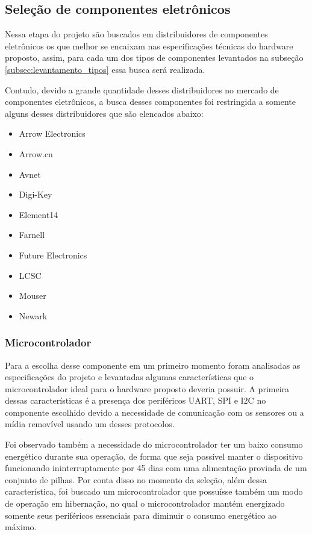\subsection{Seleção de componentes eletrônicos}

Nessa etapa do projeto são buscados em distribuidores de componentes eletrônicos os que melhor se encaixam nas especificações técnicas do hardware proposto, assim, para cada um dos tipos de componentes levantados na subseção \ref{subsec:levantamento_tipos} essa busca será realizada. 

Contudo, devido a grande quantidade desses distribuidores no mercado de componentes eletrônicos, a busca desses componentes foi restringida a somente alguns desses distribuidores que são elencados abaixo:

\begin{itemize}
    \item Arrow Electronics 	
    \item Arrow.cn 	
    \item Avnet 	
    \item Digi-Key 	
    \item Element14 	
    \item Farnell 	
    \item Future Electronics 	
    \item LCSC 	
    \item Mouser 	
    \item Newark
\end{itemize}

\subsubsection{Microcontrolador}\label{subsubsec:esp32_modulo}


Para a escolha desse componente em um primeiro momento foram analisadas as especificações do projeto e levantadas algumas características que o microcontrolador ideal para o hardware proposto deveria possuir. A primeira dessas características é a presença dos periféricos UART, SPI e I2C no componente escolhido devido a necessidade de comunicação com os sensores ou a mídia removível usando um desses protocolos.

Foi observado também a necessidade do microcontrolador ter um baixo consumo energético durante sua operação, de forma que seja possível manter o dispositivo funcionando ininterruptamente por 45 dias com uma alimentação provinda de um conjunto de pilhas. Por conta disso no momento da seleção, além dessa característica, foi buscado um microcontrolador que possuísse também um modo de operação em hibernação, no qual o microcontrolador mantém energizado somente seus periféricos essenciais para diminuir o consumo energético ao máximo. 

